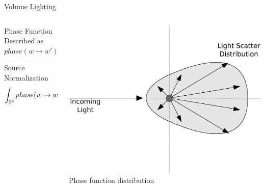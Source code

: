 \documentclass[10pt,handout,compress,professionalfont]{beamer}
\begin{document}
\begin{frame}{Volume Lighting}


    \begin{columns}
        \begin{column}{0.5\textwidth}

            \vspace{-10mm}
            \begin{block}{Phase Function}
                Described as $phase(w \to w')$
            \end{block}

            \begin{block}{Source Normalization}
                \[
                    \int_{\mathbb{S}^2}phase(w \to w')\textup{d}w' = 1.
                \]
            \end{block}

        \end{column}
        \begin{column}{0.5\textwidth}
            \vspace{-4mm}
            \includegraphics[width=\textwidth]{../img/diag/phase_func_sm}\\
            {\centering\scriptsize Phase function distribution\\}
        \end{column}
    \end{columns}

\end{frame}
\end{document}
